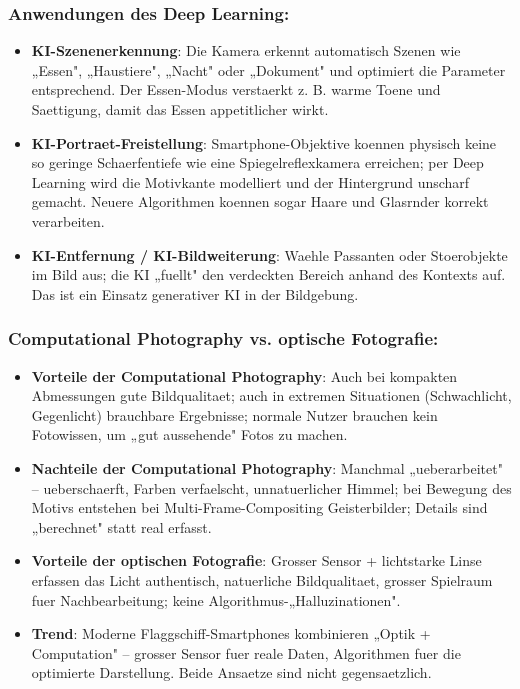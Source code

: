 \subsubsection*{Anwendungen des Deep Learning:}

\begin{itemize}
  \item \textbf{KI-Szenenerkennung}: Die Kamera erkennt automatisch Szenen wie „Essen", „Haustiere", „Nacht" oder „Dokument" und optimiert die Parameter entsprechend. Der Essen-Modus verstaerkt z. B. warme Toene und Saettigung, damit das Essen appetitlicher wirkt.
  \item \textbf{KI-Portraet-Freistellung}: Smartphone-Objektive koennen physisch keine so geringe Schaerfentiefe wie eine Spiegelreflexkamera erreichen; per Deep Learning wird die Motivkante modelliert und der Hintergrund unscharf gemacht. Neuere Algorithmen koennen sogar Haare und Glasrnder korrekt verarbeiten.
  \item \textbf{KI-Entfernung / KI-Bildweiterung}: Waehle Passanten oder Stoerobjekte im Bild aus; die KI „fuellt" den verdeckten Bereich anhand des Kontexts auf. Das ist ein Einsatz generativer KI in der Bildgebung.
\end{itemize}

\subsubsection*{Computational Photography vs. optische Fotografie:}

\begin{itemize}
  \item \textbf{Vorteile der Computational Photography}: Auch bei kompakten Abmessungen gute Bildqualitaet; auch in extremen Situationen (Schwachlicht, Gegenlicht) brauchbare Ergebnisse; normale Nutzer brauchen kein Fotowissen, um „gut aussehende" Fotos zu machen.
  \item \textbf{Nachteile der Computational Photography}: Manchmal „ueberarbeitet" – ueberschaerft, Farben verfaelscht, unnatuerlicher Himmel; bei Bewegung des Motivs entstehen bei Multi-Frame-Compositing Geisterbilder; Details sind „berechnet" statt real erfasst.
  \item \textbf{Vorteile der optischen Fotografie}: Grosser Sensor + lichtstarke Linse erfassen das Licht authentisch, natuerliche Bildqualitaet, grosser Spielraum fuer Nachbearbeitung; keine Algorithmus-„Halluzinationen".
  \item \textbf{Trend}: Moderne Flaggschiff-Smartphones kombinieren „Optik + Computation" – grosser Sensor fuer reale Daten, Algorithmen fuer die optimierte Darstellung. Beide Ansaetze sind nicht gegensaetzlich.
\end{itemize}

